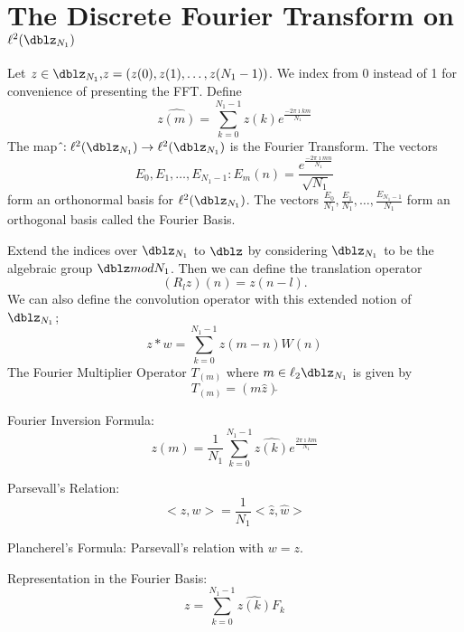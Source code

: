 \section*{The Discrete Fourier Transform on $\ell^2(\dblz_{N_1})$} Let $z \in \dblz_{N_1} ,\!
z=(z(0),z(1),\ldots,z(N_1-1))$.  We index from 0 instead of 1
for convenience of presenting the FFT. Define
\begin{equation*}
\widehat{z(m)}=\sum\limits_{k=0}^{N_1-1} z(k)e^{ \frac{-2 \pi
\imath k m}{N_1}}
\end{equation*}
The map $\hat \!: \ell^2(\dblz_{N_1}) \rightarrow
\ell^2(\dblz_{N_1})$ is the Fourier Transform. The vectors
\begin{equation*}
E_0,E_1, \ldots,E_{N_1 -1}  :\!  E_m(n)=\frac{e^\frac{-2 \pi
\imath m n}{N_1}}{\sqrt{N_1}}
\end{equation*}
form an orthonormal basis for $\ell^2(\dblz_{N_1})$. The
vectors $ \frac{E_0}{N_1},\frac{E_1}{N_1}, \ldots,\frac{E_{N_1
-1}}{N_1}$ form an orthogonal basis called the Fourier Basis.

Extend the indices over $\dblz_{N_1}$ to $\dblz$ by considering
$\dblz_{N_1}$ to be the algebraic group $\dblz mod N_1$.  Then
we can define the translation operator
\begin{equation*}
(R_l z)(n)=z(n-l).
\end{equation*}
We can also define the convolution operator with this extended
notion of $\dblz_{N_1}$;
\begin{equation*}
z * w = \sum \limits_{k=0}^{N_1-1} z(m-n)W(n)
\end{equation*}
The Fourier Multiplier Operator $T_{(m)}$ where $m \in
\ell_2{\dblz_{N_1}}$ is given by
\begin{equation*}
T_{(m)}=(m\hat z)\check{}
\end{equation*}

Fourier Inversion Formula:
\begin{equation*}
z(m)=\frac {1}{N_1}\sum\limits_{k=0}^{N_1-1} \hat{z(k)} e^{
\frac{2 \pi \imath k m}{N_1}}
\end{equation*}

Parsevall's Relation:
\begin{equation*}
<z,w>=\frac{1}{N_1}<\hat z,\hat w>
\end{equation*}

Plancherel's Formula: Parsevall's relation with $w=z$.

Representation in the Fourier Basis:
\begin{equation*}
z=\sum \limits_{k=0}^{N_1-1} \hat{z(k)} F_k
\end{equation*}

